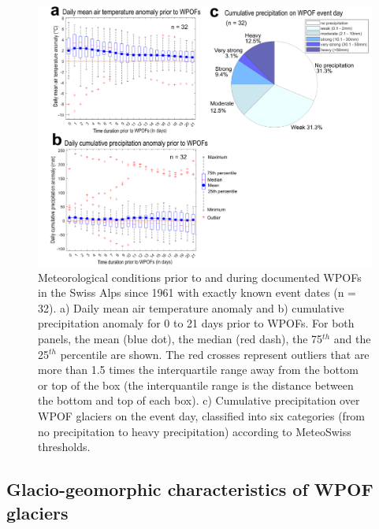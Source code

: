 \begin{figure}
    \centering
    \includegraphics[width=1\linewidth]{chapters/chapter_WPOFs/meteo_anomaly.pdf}
    \caption{Meteorological conditions prior to and during documented WPOFs in the Swiss Alps since 1961 with exactly known event dates (n = 32). a) Daily mean air temperature anomaly and b) cumulative precipitation anomaly for 0 to 21 days prior to WPOFs. For both panels, the mean (blue dot), the median (red dash), the 75$^{th}$ and the 25$^{th}$ percentile are shown. The red crosses represent outliers that are more than 1.5 times the interquartile range away from the bottom or top of the box (the interquantile range is the distance between the bottom and top of each box). c) Cumulative precipitation over WPOF glaciers on the event day, classified into six categories (from no precipitation to heavy precipitation) according to MeteoSwiss thresholds.}
    \label{fig:mto_anomaly}
\end{figure}


\subsection{ Glacio-geomorphic characteristics of WPOF glaciers}
\label{sec:envelop_geo}

